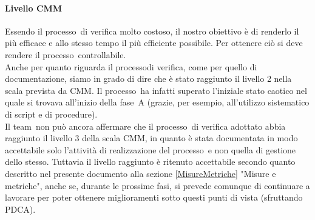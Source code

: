 \documentclass[../PianoDiQualifica.tex]{subfiles}
\begin{document}
\begin{appendices}
			\paragraph{Livello CMM}
			Essendo il processo\g\ di verifica molto costoso, il nostro obiettivo è di renderlo il più efficace e allo stesso tempo il più efficiente possibile. Per ottenere ciò si deve rendere il processo\g\ controllabile.\\
			Anche per quanto riguarda il processo\g di verifica, come per quello di documentazione, siamo in grado di dire che è stato raggiunto il livello 2 nella scala prevista da CMM\g. Il processo\g\ ha infatti superato l'iniziale stato caotico nel quale si trovava all'inizio della fase\g\ A (grazie, per esempio, all'utilizzo sistematico di script e di procedure). \\
			Il team\g\ non può ancora affermare che il processo\g\ di verifica adottato abbia raggiunto il livello 3 della scala CMM\g, in quanto è stata documentata in modo accettabile solo l'attività di realizzazione del processo\g\ e non quella di gestione dello stesso. Tuttavia il livello raggiunto è ritenuto accettabile secondo quanto descritto nel presente documento alla sezione \ref{MisureMetriche} "Misure e metriche", anche se, durante le prossime fasi, si prevede comunque di continuare a lavorare per poter ottenere miglioramenti sotto questi punti di vista (sfruttando PDCA\g).
\end{appendices}
\end{document}
